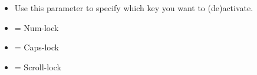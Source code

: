 %
\begin{itemize}
\item Use this parameter to specify which key you want to (de)activate.
\item {} = Num-lock
\item {} = Caps-lock
\item {} = Scroll-lock
\end{itemize}
